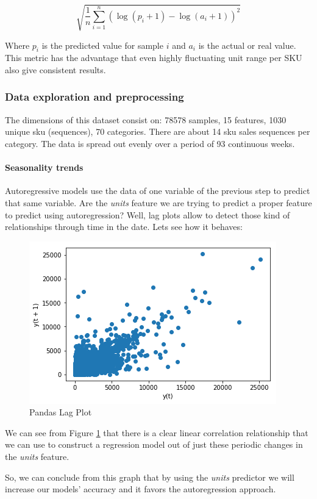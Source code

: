 \documentclass[]{article}
\let\oldparagraph\paragraph
\renewcommand{\paragraph}[1]{\oldparagraph{#1}\mbox{}}
\theoremstyle{definition}
\theoremstyle{definition}
\theoremstyle{definition}
\theoremstyle{remark}
\begin{document}
\[
\sqrt{\frac{1}{n}\sum_{i=1}^{n}(\log(p_i+1)-\log(a_i+1))^2}
\]

Where \(p_i\) is the predicted value for sample \(i\) and \(a_i\) is the
actual or real value. This metric has the advantage that even highly
fluctuating unit range per SKU also give consistent results.

\subsubsection{Data exploration and
preprocessing}\label{data-exploration-and-preprocessing}

The dimensions of this dataset consist on: 78578 samples, 15 features,
1030 unique sku (sequences), 70 categories. There are about 14 sku sales
sequences per category. The data is spread out evenly over a period of
93 continuous weeks.

\paragraph{Seasonality trends}\label{seasonality-trends}

Autoregressive models use the data of one variable of the previous step
to predict that same variable. Are the \emph{units} feature we are
trying to predict a proper feature to predict using autoregression?
Well, lag plots allow to detect those kind of relationships through time
in the date. Lets see how it behaves:

\begin{figure}

{\centering \includegraphics[width=0.4\linewidth]{./media/lag_plot} 

}

\caption{Pandas Lag Plot}\label{fig:fig1}
\end{figure}

We can see from Figure \ref{fig:fig1} that there is a clear linear
correlation relationship that we can use to construct a regression model
out of just these periodic changes in the \emph{units} feature.

So, we can conclude from this graph that by using the \emph{units}
predictor we will increase our models' accuracy and it favors the
autoregression approach.
\end{document}
